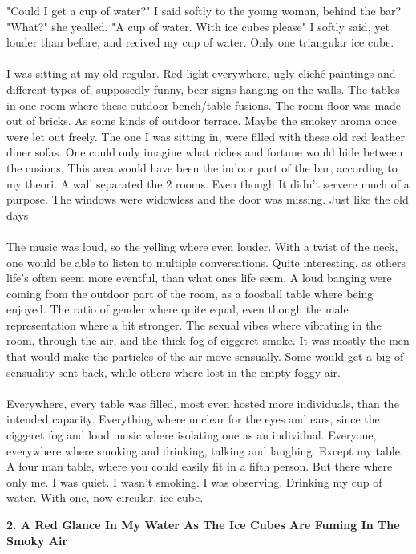 \documentclass[]{article}
\begin{document}
"Could I get a cup of water?" I said softly to the young woman, behind the bar?
"What?" she yealled.
"A cup of water. With ice cubes please" I softly said, yet louder than before, and recived my cup of water. Only one triangular ice cube.
\\ \\
I was sitting at my old regular. Red light everywhere, ugly cliché paintings and different types of, supposedly funny, beer signs hanging on the walls. The tables in one room where these outdoor bench/table fusions. The room floor was made out of bricks. As some kinds of outdoor terrace. Maybe the smokey aroma once were let out freely. The one I was sitting in, were filled with these old red leather diner sofas. One could only imagine what riches and fortune would hide between the cusions. This area would have been the indoor part of the bar, according to my theori. A wall separated the 2 rooms. Even though It didn't  servere much of a purpose. The windows were widowless and the door was missing. Just like the old days
\\ \\
The music was loud, so the yelling where even louder. With a twist of the neck, one would be able to listen to multiple conversations. Quite interesting, as others life's often seem more eventful, than what ones life seem. A loud banging were coming from the outdoor part of the room, as a foosball table where being enjoyed. The ratio of gender where quite equal, even though the male representation where a bit stronger. The sexual vibes where vibrating in the room, through the air, and the thick fog of ciggeret smoke. It was mostly the men that would make the particles of the air move sensually. Some would get a big of sensuality sent back, while others where lost in the empty foggy air. 
\\ \\
Everywhere, every table was filled, most even hosted more individuals, than the intended capacity. Everything where unclear for the eyes and ears, since the ciggeret fog and loud music where isolating one as an individual. Everyone, everywhere where smoking and drinking, talking and laughing. Except my table. A four man table, where you could easily fit in a fifth person. But there where only me. I was quiet. I wasn't smoking. I was observing. Drinking my cup of water. With one, now circular, ice cube.

\newpage

\begin{center}
	\large\textbf{2. A Red Glance In My Water As \newline The Ice Cubes Are Fuming In The Smoky Air}
\end{center}
\end{document}
